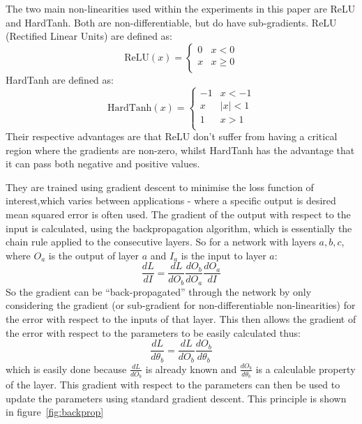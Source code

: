 The two main non-linearities used within the experiments in this paper are ReLU and HardTanh. Both are non-differentiable, but do have sub-gradients. ReLU (Rectified Linear Units) are defined as:
\begin{equation}
\text{ReLU}(x) = \begin{cases}
0 & x < 0 \\
x & x \ge 0 \\
\end{cases}
\end{equation}
HardTanh are defined as:
\begin{equation}
\text{HardTanh}(x) = \begin{cases}
-1 & x < -1 \\
x & |x| < 1 \\
1 & x > 1 \\
\end{cases}
\end{equation}
Their respective advantages are that ReLU don't suffer from having a critical region where the gradients are non-zero, whilst HardTanh has the advantage that it can pass both negative and positive values.

They are trained using gradient descent to minimise the loss function of interest,which varies between applications - where a specific output is desired mean squared error is often used. The gradient of the output with respect to the input is calculated, using the backpropagation algorithm, which is essentially the chain rule applied to the consecutive layers. So for a network with layers $a, b, c$, where $O_a$ is the output of layer $a$ and $I_a$ is the input to layer $a$:
\begin{equation}
\frac{dL}{dI}  = \frac{dL}{dO_b} \frac{dO_b}{dO_a} \frac{dO_a}{dI} 
\end{equation} 
So the gradient can be ``back-propagated'' through the network by only considering the gradient (or sub-gradient for non-differentiable non-linearities) for the error with respect to the inputs of that layer. This then allows the gradient of the error with respect to the parameters to be easily calculated thus:
\begin{equation}
\frac{dL}{d\theta_b} = \frac{dL}{dO_b}\frac{dO_b}{d\theta_b} 
\end{equation}
which is easily done because $\frac{dL}{dO_b}$ is already known and $\frac{dO_b}{d\theta_b}$ is a calculable property of the layer. This gradient with respect to the parameters can then be used to update the parameters using standard gradient descent. This principle is shown in figure~\ref{fig:backprop}

